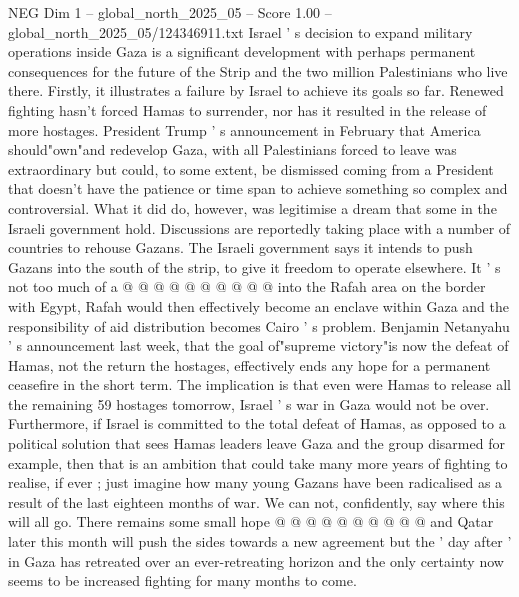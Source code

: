 \begin{textsample}{NEG Dim 1 – global\_north\_2025\_05 – Score 1.00 – global\_north\_2025\_05/124346911.txt}  \label{ex:f1_neg_083}
Israel ' s decision to expand military operations inside Gaza is a significant development with perhaps permanent consequences for the future of the Strip and the two million Palestinians who live there.
Firstly, it illustrates a failure by Israel to achieve its goals so far.
Renewed fighting hasn't forced Hamas to surrender, nor has it resulted in the release of more hostages.
President Trump ' s announcement in February that America should"own"and redevelop Gaza, with all Palestinians forced to leave was extraordinary but could, to some extent, be dismissed coming from a President that doesn't have the patience or time span to achieve something so complex and controversial.
What it did do, however, was legitimise a dream that some in the Israeli government hold.
Discussions are reportedly taking place with a number of countries to rehouse Gazans.
The Israeli government says it intends to push Gazans into the south of the strip, to give it freedom to operate elsewhere.
It ' s not too much of a @ @ @ @ @ @ @ @ @ @ into the Rafah area on the border with Egypt, Rafah would then effectively become an enclave within Gaza and the responsibility of aid distribution becomes Cairo ' s problem.
Benjamin Netanyahu ' s announcement last week, that the goal of"supreme victory"is now the defeat of Hamas, not the return the hostages, effectively ends any hope for a permanent ceasefire in the short term.
The implication is that even were Hamas to release all the remaining 59 hostages tomorrow, Israel ' s war in Gaza would not be over.
Furthermore, if Israel is committed to the total defeat of Hamas, as opposed to a political solution that sees Hamas leaders leave Gaza and the group disarmed for example, then that is an ambition that could take many more years of fighting to realise, if ever ; just imagine how many young Gazans have been radicalised as a result of the last eighteen months of war.
We can not, confidently, say where this will all go.
There remains some small hope @ @ @ @ @ @ @ @ @ @ and Qatar later this month will push the sides towards a new agreement but the ' day after ' in Gaza has retreated over an ever-retreating horizon and the only certainty now seems to be increased fighting for many months to come.

\end{textsample}
